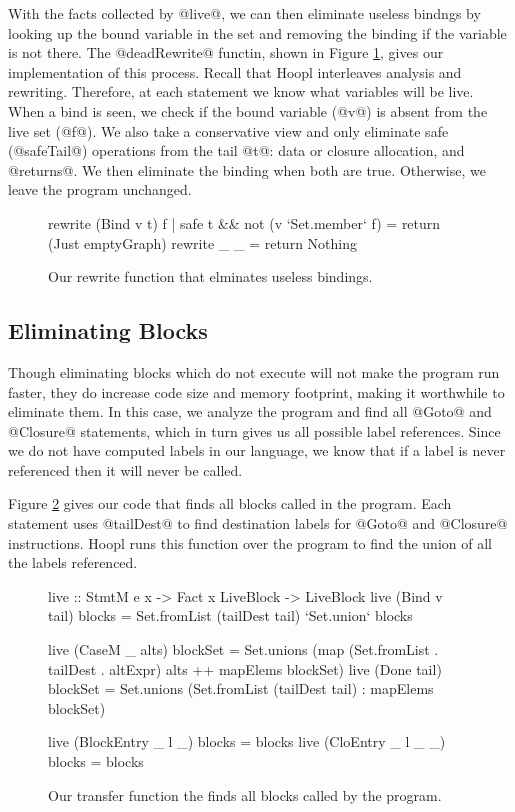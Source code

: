 \documentclass[12pt]{report}
\begin{document}
With the facts collected by @live@, we can then eliminate useless
bindngs by looking up the bound variable in the set and removing the
binding if the variable is not there. The @deadRewrite@ functin, shown
in Figure \ref{ref_fig_deadRewrite}, gives our implementation of this
process. Recall that Hoopl interleaves analysis and rewriting.
Therefore, at each statement we know what variables will be live. When
a bind is seen, we check if the bound variable (@v@) is absent from
the live set (@f@). We also take a conservative view and only
eliminate safe (@safeTail@) operations from the tail @t@: data or closure
allocation, and @returns@. We then eliminate the binding when both are
true. Otherwise, we leave the program unchanged.

\begin{figure}[h]
\begin{code}
rewrite (Bind v t) f 
  | safe t && not (v `Set.member` f) = return (Just emptyGraph)
rewrite _ _ = return Nothing
\end{code}
\caption{Our rewrite function that elminates useless bindings.}
\label{ref_fig_deadRewrite}
\end{figure}

\subsection{Eliminating Blocks}

Though eliminating blocks which do not execute will not make the
program run faster, they do increase code size and memory footprint, making
it worthwhile to eliminate them. In this case, we analyze the program and
find all @Goto@ and @Closure@ statements, which in turn gives us all
possible label references. Since we do not have computed labels in our
language, we know that if a label is never referenced then it will
never be called. 

Figure \ref{ref_figure_liveBlocks} gives our code that finds all 
blocks called in the program. Each statement uses @tailDest@ to find
destination labels for @Goto@ and @Closure@ instructions. Hoopl runs
this function over the program to find the union of all the labels
referenced. 

\begin{figure}[h]
\begin{code}
live :: StmtM e x -> Fact x LiveBlock -> LiveBlock
live (Bind v tail) blocks = Set.fromList (tailDest tail) `Set.union` blocks

live (CaseM _ alts) blockSet = Set.unions (map (Set.fromList . tailDest . altExpr) alts 
  ++ mapElems blockSet)
live (Done tail) blockSet =  Set.unions (Set.fromList (tailDest tail) : mapElems blockSet)

live (BlockEntry _ l _) blocks = blocks
live (CloEntry _ l _ _) blocks = blocks
\end{code}
\caption{Our transfer function the finds all blocks called by the program.}
\label{ref_figure_liveBlocks}
\end{figure}
\end{document}
